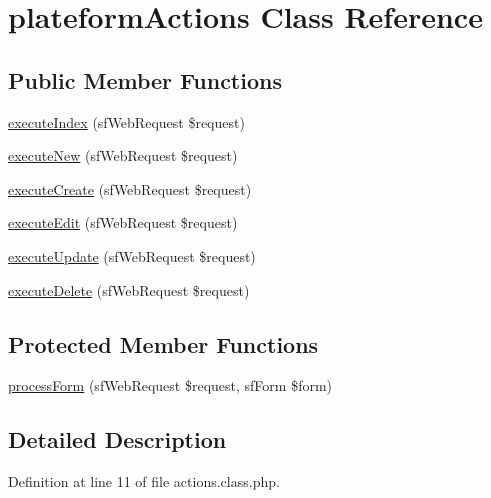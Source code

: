\hypertarget{classplateform_actions}{\section{plateform\-Actions Class Reference}
\label{classplateform_actions}
}
\subsection*{Public Member Functions}
\begin{DoxyCompactItemize}
\item 
\hyperlink{classplateform_actions_a948cc911eb1d9f77990be54af3b2080f}{execute\-Index} (sf\-Web\-Request \$request)
\item 
\hyperlink{classplateform_actions_a0ffbea56560c6c633dae68ec22aff21c}{execute\-New} (sf\-Web\-Request \$request)
\item 
\hyperlink{classplateform_actions_a75837617743fb64dca82d8133b2c662a}{execute\-Create} (sf\-Web\-Request \$request)
\item 
\hyperlink{classplateform_actions_af4d8fedd4b28f3398826a1bb8fa54394}{execute\-Edit} (sf\-Web\-Request \$request)
\item 
\hyperlink{classplateform_actions_af7b4f51862add3c2ebb54efc136a0840}{execute\-Update} (sf\-Web\-Request \$request)
\item 
\hyperlink{classplateform_actions_a52b5b11b11a0070dd2662257520c045a}{execute\-Delete} (sf\-Web\-Request \$request)
\end{DoxyCompactItemize}
\subsection*{Protected Member Functions}
\begin{DoxyCompactItemize}
\item 
\hyperlink{classplateform_actions_a7cf661d837626e0320753cbffa019a01}{process\-Form} (sf\-Web\-Request \$request, sf\-Form \$form)
\end{DoxyCompactItemize}


\subsection{Detailed Description}


Definition at line 11 of file actions.\-class.\-php.




